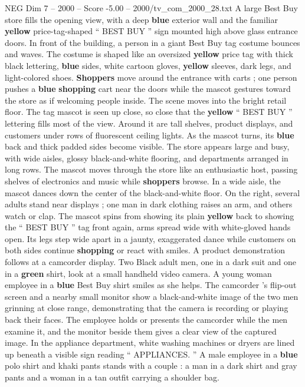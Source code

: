 \begin{textsample}{NEG Dim 7 – 2000 – Score -5.00 – 2000/tv\_com\_2000\_28.txt}  \label{ex:f7_neg_024}
A large Best Buy store fills the opening view, with a deep \textbf{blue} exterior wall and the familiar \textbf{yellow} price-tag-shaped “ BEST BUY ” sign mounted high above glass entrance doors.
In front of the building, a person in a giant Best Buy tag costume bounces and waves.
The costume is shaped like an oversized \textbf{yellow} price tag with thick black lettering, \textbf{blue} sides, white cartoon gloves, \textbf{yellow} sleeves, dark legs, and light-colored shoes. \textbf{Shoppers} move around the entrance with carts ; one person pushes a \textbf{blue} \textbf{shopping} cart near the doors while the mascot gestures toward the store as if welcoming people inside.
The scene moves into the bright retail floor.
The tag mascot is seen up close, so close that the \textbf{yellow} “ BEST BUY ” lettering fills most of the view.
Around it are tall shelves, product displays, and customers under rows of fluorescent ceiling lights.
As the mascot turns, its \textbf{blue} back and thick padded sides become visible.
The store appears large and busy, with wide aisles, glossy black-and-white flooring, and departments arranged in long rows.
The mascot moves through the store like an enthusiastic host, passing shelves of electronics and music while \textbf{shoppers} browse.
In a wide aisle, the mascot dances down the center of the black-and-white floor.
On the right, several adults stand near displays ; one man in dark clothing raises an arm, and others watch or clap.
The mascot spins from showing its plain \textbf{yellow} back to showing the “ BEST BUY ” tag front again, arms spread wide with white-gloved hands open.
Its legs step wide apart in a jaunty, exaggerated dance while customers on both sides continue \textbf{shopping} or react with smiles.
A product demonstration follows at a camcorder display.
Two Black adult men, one in a dark suit and one in a \textbf{green} shirt, look at a small handheld video camera.
A young woman employee in a \textbf{blue} Best Buy shirt smiles as she helps.
The camcorder ’s flip-out screen and a nearby small monitor show a black-and-white image of the two men grinning at close range, demonstrating that the camera is recording or playing back their faces.
The employee holds or presents the camcorder while the men examine it, and the monitor beside them gives a clear view of the captured image.
In the appliance department, white washing machines or dryers are lined up beneath a visible sign reading “ APPLIANCES. ” A male employee in a \textbf{blue} polo shirt and khaki pants stands with a couple : a man in a dark shirt and gray pants and a woman in a tan outfit carrying a shoulder bag.

\end{textsample}
